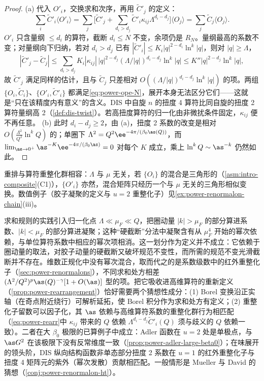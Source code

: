 \begin{proof}
(a) 代入 $O'_i$，交换求和次序，再用 $\tilde C'_j$ 的定义：
\begin{equation*}
\sum_i\tilde C'_i\langle O'_i\rangle=\sum_j\Big[\tilde C'_j+\sum_{d_i>d_j}\tilde C'_i\kappa_{ij}\Lambda^{d_i-d_j}\Big]\langle O_j\rangle=\sum_j\tilde C_j\langle O_j\rangle .
\end{equation*}
$O'_i$ 只含量纲 $\le d_i$ 的算符，截断 $d_i\le N$ 不变，余项仍是 $R_N$。量纲最高的系数不变；对量纲向下归纳，若对 $d_i>d_j$ 已有 $|\tilde C'_i|\le K_i|q|^{2-d_i}\ln^k|q|$，则对 $|q|\ge\Lambda$，
\begin{equation*}
|\tilde C'_j-\tilde C_j|\le\sum_{d_i>d_j}K_i|\kappa_{ij}|\,|q|^{2-d_j}(\Lambda/|q|)^{d_i-d_j}\ln^k|q|\le K''|q|^{2-d_j}\ln^k|q| ,
\end{equation*}
故 $\tilde C'_j$ 满足同样的估计，且与 $\tilde C_j$ 只差相对 $O((\Lambda/|q|)^{d_i-d_j}\ln^k|q|)$ 的项。两组 $\{O_i,\tilde C_i\}$、$\{O'_i,\tilde C'_i\}$ 都满足\eqref{eq:power-ope-N}，展开本身无法区分它们——这就是“只在该精度内有意义”的含义。DIS 中自旋 $n$ 的扭度 4 算符比同自旋的扭度 2 算符量纲高 2（\cref{def:dis-twist}）。若高扭度算符的归一化由非微扰条件固定，$\kappa_{ij}$ 便不再任意。
(b) 此时 $d_i-d_j\ge2$，由 (a)，扭度 2 系数的改变是相对 $O(\frac{\Lambda^2}{Q^2}\ln^kQ)$ 的；单圈下 $\Lambda^2=Q^2\ee^{-4\pi/(\beta_0\as(Q))}$，而 $\lim_{\as\to0^+}\as^{-K}\ee^{-4\pi/(\beta_0\as)}=0$ 对每个 $K$ 成立，乘上 $\ln^kQ\sim\as^{-k}$ 仍然如此。
\end{proof}

重排与算符重整化群相容：$\Lambda$ 与 $\mu$ 无关，若 $\{O_i\}$ 的混合是三角形的（\cref{asm:intro-composite}(C1)），$\{O'_i\}$ 亦然，混合矩阵只经历一个与 $\mu$ 无关的三角形相似变换。数值例子（胶子凝聚的定义与 $u=2$ 重整化子）见\cref{ex:power-renormalon-chain}(iii)。

\begin{remark}\label{rem:power-practical-ope}
求和规则的实践引入归一化点 $\Lambda\ll\mu_F\ll Q$，把圈动量 $|k|>\mu_F$ 的部分算进系数、$|k|<\mu_F$ 的部分算进凝聚\cite{Novikov:1984rf}；这种“硬截断”分法中凝聚含有从 $\mu_F^4$ 开始的幂次依赖，与单位算符系数中相应的幂次项相消\cite[第~2.3~节]{Beneke1999}。这一划分作为定义并不成立：它依赖于圈动量的取法，对胶子动量的硬截断又破坏规范不变性，而所需的规范不变光滑截断并不存在。维数正规化中没有幂次混合，取而代之的是系数级数中的红外重整化子（\cref{sec:power-renormalons}），不同求和处方相差 $(\Lambda^2/Q^2)^p\as(Q)^{-\gamma}[1+O(\as)]$ 型的项。把它吸收进高维算符的重新定义（\cref{prop:power-rearrangement}）恰好需要两个猜想性成分：(1) Borel 变换沿正实轴（在奇点附近绕行）可解析延拓，使 Borel 积分作为求和处方有定义；(2) 重整化子留数可以因子化，其 $\as$ 依赖与高维算符系数的重整化群行为相匹配（\eqref{eq:power-rearr}中 $\kappa_{ij}$ 带来的 $Q$ 依赖 $\Lambda^{d_i-d_j}\tilde C'_i(Q)$ 须与歧义的 $Q$ 依赖一致）。二者在大 $\beta_0$ 极限的已算例子中成立：Adler 函数在 $u=2$ 处是单极点，与 $\as G^2$ 在该极限下没有反常维度一致（\cref{prop:power-adler-large-beta0}）；在味展开的领头阶，DIS 纵向结构函数非单态部分扭度 2 系数在 $u=1$ 的红外重整化子与扭度 4 矩阵元的紫外（幂次发散）贡献相匹配\cite[第~4.2.2~节]{Beneke1999}。一般情形是 Mueller 与 David 的猜想（\cref{conj:power-renormalon-ht}）。
\end{remark}
